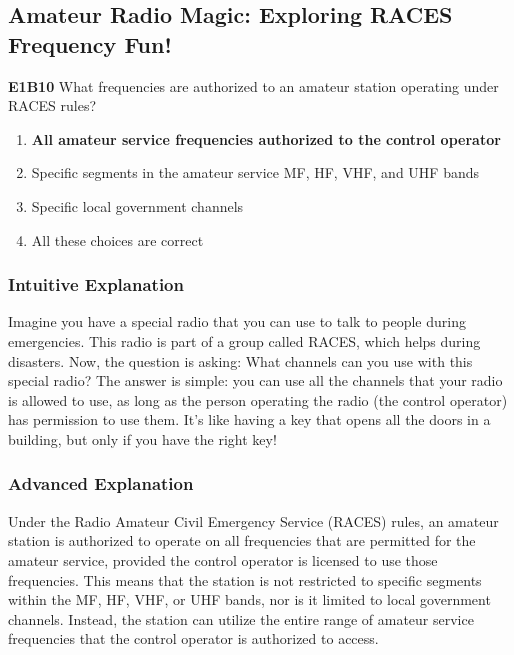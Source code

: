 \subsection{Amateur Radio Magic: Exploring RACES Frequency Fun!}
\label{sec:E1B10}

\begin{tcolorbox}[colback=gray!10!white,colframe=black!75!black,title=E1B10]
\textbf{E1B10} What frequencies are authorized to an amateur station operating under RACES rules?

\begin{enumerate}[label=\Alph*.]
    \item \textbf{All amateur service frequencies authorized to the control operator}
    \item Specific segments in the amateur service MF, HF, VHF, and UHF bands
    \item Specific local government channels
    \item All these choices are correct
\end{enumerate}
\end{tcolorbox}

\subsubsection{Intuitive Explanation}
Imagine you have a special radio that you can use to talk to people during emergencies. This radio is part of a group called RACES, which helps during disasters. Now, the question is asking: What channels can you use with this special radio? The answer is simple: you can use all the channels that your radio is allowed to use, as long as the person operating the radio (the control operator) has permission to use them. It's like having a key that opens all the doors in a building, but only if you have the right key!

\subsubsection{Advanced Explanation}
Under the Radio Amateur Civil Emergency Service (RACES) rules, an amateur station is authorized to operate on all frequencies that are permitted for the amateur service, provided the control operator is licensed to use those frequencies. This means that the station is not restricted to specific segments within the MF, HF, VHF, or UHF bands, nor is it limited to local government channels. Instead, the station can utilize the entire range of amateur service frequencies that the control operator is authorized to access.

